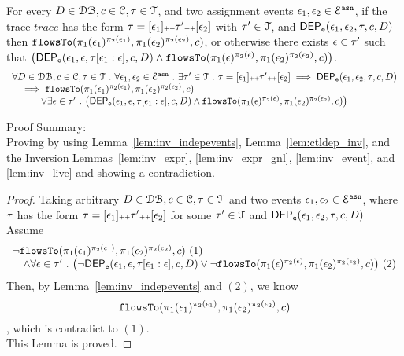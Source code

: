 \begin{lem}
	\label{lem:depevents_exist}
For every $D \in \mathcal{DB} , c \in \mathcal{C}, \mathtt{\tau} \in \mathcal{T}$, and two assignment events 
$\mathtt{\epsilon}_1, \mathtt{\epsilon}_2 \in \mathcal{E}^{\mathtt{{asn}}}$,
if the trace $trace$ has the form $\mathtt{\tau} = [\mathtt{\epsilon}_1] {\scriptscriptstyle ++} \mathtt{\tau}' {\scriptscriptstyle ++} [\mathtt{\epsilon}_2]$ with $\mathtt{\tau}' \in \mathcal{T}$, and $\mathsf{DEP_{\mathtt{e}}}(\mathtt{\epsilon}_1, \mathtt{\epsilon}_2, \mathtt{\tau}, c, D)$
then $\mathtt{flowsTo}(\pi_1(\mathtt{\epsilon}_1)^{\pi_2(\mathtt{\epsilon}_1)}, \pi_1(\mathtt{\epsilon}_2)^{\pi_2(\mathtt{\epsilon}_2)}, c) $,
or otherwise there exists
$\mathtt{\epsilon} \in \mathtt{\tau}'$ such that
$\left( 		
   \eventdep(\event_1, \event, \trace[\event_1:\event], c, D)
\land 
\flowsto(\pi_1(\event)^{\pi_2(\event)}, \pi_1(\event_2)^{\pi_2(\event_2)}, c) 
\right)$.
%
	\[
	\begin{array}{l}
		\forall D \in \dbdom , c \in \cdom, \trace \in \mathcal{T} \st \forall \event_1, \event_2 \in \eventset^{\asn} \st
		 \exists \trace' \in \mathcal{T} \st \trace = [\event_1] \tracecat \trace' \tracecat [\event_2]
		\implies
		\eventdep(\event_1, \event_2, \trace, c, D) 
		\\ \quad 
		\implies 
		\flowsto(\pi_1(\event_1)^{\pi_2(\event_1)}, \pi_1(\event_2)^{\pi_2(\event_2)}, c) 
		\\ \qquad \quad \lor
		\exists \event \in \trace' \st 
		\left( 		
			\eventdep(\event_1, \event, \trace[\event_1:\event], c, D)
		\land 
		\flowsto(\pi_1(\event)^{\pi_2(\event)}, \pi_1(\event_2)^{\pi_2(\event_2)}, c) 
	\right) 
	\end{array}
	\]
\end{lem}
Proof Summary: 
\\
Proving by using Lemma~\ref{lem:inv_indepevents}, Lemma~\ref{lem:ctldep_inv}, and the Inversion Lemmas~\ref{lem:inv_expr}, \ref{lem:inv_expr_gnl},
\ref{lem:inv_event}, and \ref{lem:inv_live}
and showing a contradiction.
\begin{proof}
	Taking arbitrary 
	$ D \in \mathcal{DB} , c \in \mathcal{C}, \mathtt{\tau} \in \mathcal{T} $ and two events 
	$\mathtt{\epsilon}_1, \mathtt{\epsilon}_2 \in \mathcal{E}^{\mathtt{{asn}}}$, where $\mathtt{\tau}$ has the form 
	$\mathtt{\tau} = [\mathtt{\epsilon}_1] {\scriptscriptstyle ++} \mathtt{\tau}' {\scriptscriptstyle ++} [\mathtt{\epsilon}_2]$ 
	for some 
	$\mathtt{\tau}' \in \mathcal{T}$ and $\mathsf{DEP_{\mathtt{e}}}(\mathtt{\epsilon}_1, \mathtt{\epsilon}_2, \mathtt{\tau}, c, D)$
	\\ 
	Assume 
	\[
		\begin{array}{l}
	\neg \flowsto(\pi_1(\event_1)^{\pi_2(\event_1)}, \pi_1(\event_2)^{\pi_2(\event_2)}, c) ~ (1)
	\\ \quad 
	\land 
	\forall \event \in \trace' \st 
	\left( 		
		\neg \eventdep(\event_1, \event, \trace[\event_1:\event], c, D)
	\lor 
		\neg \flowsto(\pi_1(\event)^{\pi_2(\event)}, \pi_1(\event_2)^{\pi_2(\event_2)}, c) 
	\right) ~ (2)
	\end{array}
	\]
	Then, by Lemma~\ref{lem:inv_indepevents} and $(2)$, we know 
	$$\mathtt{flowsTo}(\pi_1(\mathtt{\epsilon}_1)^{\pi_2(\mathtt{\epsilon}_1)}, \pi_1(\mathtt{\epsilon}_2)^{\pi_2(\mathtt{\epsilon}_2)}, c)$$
	, which is contradict to $(1)$.
	\\
	This Lemma is proved.
\end{proof}
